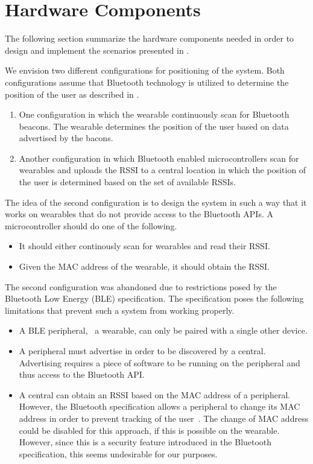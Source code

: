\section{Hardware Components}
\label{sec:analysis:system-components}

The following section summarize the hardware components needed in order to design and implement the scenarios presented in .

We envision two different configurations for positioning of the system. Both configurations assume that Bluetooth technology is utilized to determine the position of the user as described in .

\begin{enumerate}
\item One configuration in which the wearable continuously scan for Bluetooth beacons. The wearable determines the position of the user based on data advertised by the bacons.
\item Another configuration in which Bluetooth enabled microcontrollers scan for wearables and uploads the RSSI to a central location in which the position of the user is determined based on the set of available RSSIs.
\end{enumerate}

The idea of the second configuration is to design the system in such a way that it works on wearables that do not provide access to the Bluetooth APIs. A microcontroller should do one of the following.

\begin{itemize}
\item It should either continously scan for wearables and read their RSSI.
\item Given the MAC address of the wearable, it should obtain the RSSI.
\end{itemize}

The second configuration was abandoned due to restrictions posed by the Bluetooth Low Energy (BLE) specification. The specification poses the following limitations that prevent such a system from working properly.

\begin{itemize}
\item A BLE peripheral, \eg~a wearable, can only be paired with a single other device.
\item A peripheral must advertise in order to be discovered by a central. Advertising requires a piece of software to be running on the peripheral and thus access to the Bluetooth API.
\item A central can obtain an RSSI based on the MAC address of a peripheral. However, the Bluetooth specification allows a peripheral to change its MAC address in order to prevent tracking of the user~\cite[p.~91]{Bluetooth2010Bluetooth_vol_1}. The change of MAC address could be disabled for this approach, if this is possible on the wearable. However, since this is a security feature introduced in the Bluetooth specification, this seems undesirable for our purposes.
\end{itemize}

